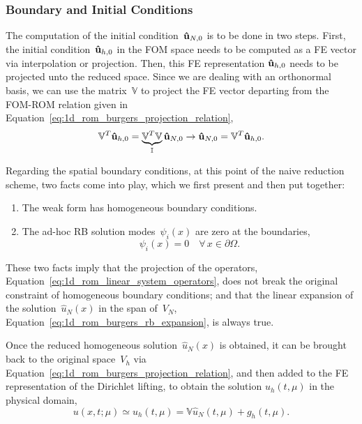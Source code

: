 \documentclass[../../thesis.tex]{subfiles}
\newcommand{\rbV}{\ensuremath{\mathbb{V}}}
\newcommand{\rbVT}{\ensuremath{\rbV^T}}
\begin{document}
\subsubsection{Boundary and Initial Conditions}
The computation of the initial condition~$\vb{\hat{u}}_{N,0}$ is to be done in two steps. 
First, the initial condition~$\vb{\hat{u}}_{h,0}$ in the FOM space needs to be computed as a FE vector via interpolation or projection.
Then, this FE representation $\vb{\hat{u}}_{h,0}$ needs to be projected unto the reduced space. 
Since we are dealing with an orthonormal basis, we can use the matrix~$\rbV$ to project the FE vector departing from the \mbox{FOM-ROM} relation given in Equation~\eqref{eq:1d_rom_burgers_projection_relation},
\begin{equation}
    \rbVT \vb{\hat{u}}_{h,0} = \underbrace{\rbVT \rbV}_{\mathbb{I}} \vb{\hat{u}}_{N,0} 
    \rightarrow 
    \vb{\hat{u}}_{N,0} = \rbVT \vb{\hat{u}}_{h,0}.
\end{equation}

Regarding the spatial boundary conditions, at this point of the naive reduction scheme, two facts come into play, which we first present and then put together:
\begin{enumerate}
    \item The weak form has homogeneous boundary conditions.
    \item The ad-hoc RB solution modes~$\psi_i(x)$ are zero at the boundaries,
    \begin{equation*}
        \psi_i(x) = 0 \quad \forall \, x \in \partial \Omega.
    \end{equation*}
\end{enumerate}
These two facts imply that the projection of the operators, 
Equation~\eqref{eq:1d_rom_linear_system_operators}, 
does not break the original constraint of homogeneous boundary conditions;
and that the linear expansion of the solution~$\hat{u}_N(x)$ in the span of~$V_N$, 
Equation~\eqref{eq:1d_rom_burgers_rb_expansion}, 
is always true.

Once the reduced homogeneous solution~$\hat{u}_N(x)$ is obtained, 
it can be brought back to the original space~$V_h$ via 
Equation~\eqref{eq:1d_rom_burgers_projection_relation}, 
and then added to the FE representation of the Dirichlet lifting, 
to obtain the solution $u_h(t, \mu)$ in the physical domain,
\begin{equation}
    u(x, t; \mu) \simeq u_h(t, \mu) = \rbV \hat{u}_N(t, \mu) + g_h(t,\mu).
\end{equation}
\end{document}
